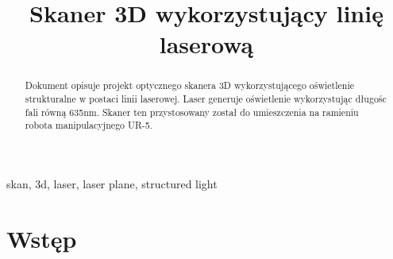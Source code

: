 \documentclass[conference]{IEEEtran}
\begin{document}
\title{Skaner 3D wykorzystujący linię laserową\\}


\author{
\and
{}

}

\maketitle

\begin{abstract}
Dokument opisuje projekt optycznego skanera 3D wykorzystującego oświetlenie strukturalne w postaci linii laserowej. Laser generuje oświetlenie wykorzystując długośc fali równą 635nm. Skaner ten przystosowany został do umieszczenia na ramieniu robota manipulacyjnego UR-5.

\end{abstract}

\begin{IEEEkeywords}
skan, 3d, laser, laser plane, structured light
\end{IEEEkeywords}

\section{Wstęp}
\end{document}
